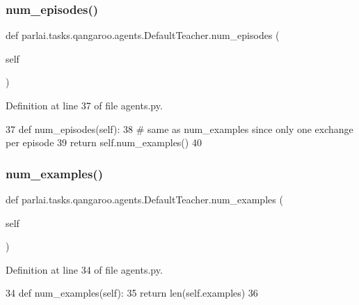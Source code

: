 \subsubsection{\texorpdfstring{num\+\_\+episodes()}{num\_episodes()}}
{\footnotesize\ttfamily def parlai.\+tasks.\+qangaroo.\+agents.\+Default\+Teacher.\+num\+\_\+episodes (\begin{DoxyParamCaption}\item[{}]{self }\end{DoxyParamCaption})}



Definition at line 37 of file agents.\+py.


\begin{DoxyCode}
37     \textcolor{keyword}{def }num\_episodes(self):
38         \textcolor{comment}{# same as num\_examples since only one exchange per episode}
39         \textcolor{keywordflow}{return} self.num\_examples()
40 
\end{DoxyCode}
\mbox{\label{classparlai_1_1tasks_1_1qangaroo_1_1agents_1_1DefaultTeacher_a88e8755506c654d988f3071823941b91}} 
\subsubsection{\texorpdfstring{num\+\_\+examples()}{num\_examples()}}
{\footnotesize\ttfamily def parlai.\+tasks.\+qangaroo.\+agents.\+Default\+Teacher.\+num\+\_\+examples (\begin{DoxyParamCaption}\item[{}]{self }\end{DoxyParamCaption})}



Definition at line 34 of file agents.\+py.


\begin{DoxyCode}
34     \textcolor{keyword}{def }num\_examples(self):
35         \textcolor{keywordflow}{return} len(self.examples)
36 
\end{DoxyCode}
\mbox{\label{classparlai_1_1tasks_1_1qangaroo_1_1agents_1_1DefaultTeacher_a9563de73ddadc0d567516f5b1615a264}} 
